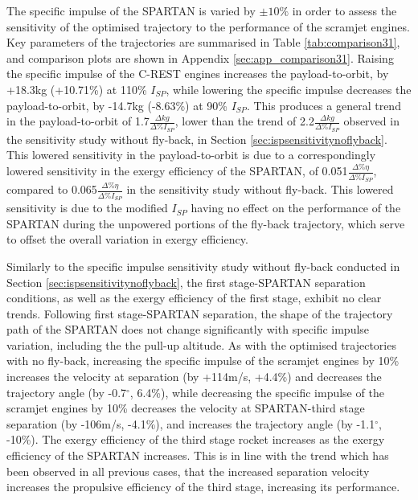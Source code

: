 The specific impulse of the SPARTAN is varied by $\pm10\%$ in order to assess the sensitivity of the optimised trajectory to the performance of the scramjet engines. 
Key parameters of the trajectories are summarised in Table \ref{tab:comparison31}, and comparison plots are shown in Appendix \ref{sec:app_comparison31}.
Raising the specific impulse of the C-REST engines increases the payload-to-orbit, by +18.3kg (+10.71\%) at 110\% $I_{SP}$, while lowering the specific impulse decreases the payload-to-orbit, by -14.7kg (-8.63\%) at 90\% $I_{SP}$. 
This produces a general trend in the payload-to-orbit of 1.7$\frac{\Delta kg}{\Delta \%I_{SP} }$, lower than the trend of 2.2$\frac{\Delta kg}{\Delta \%I_{SP} }$ observed in the sensitivity study without fly-back, in Section \ref{sec:ispsensitivitynoflyback}.
This lowered sensitivity in the payload-to-orbit is due to a correspondingly lowered sensitivity in the exergy efficiency of the SPARTAN, of 0.051$\frac{\Delta \% \eta}{\Delta \%I_{SP} }$, compared to 0.065$\frac{\Delta \% \eta}{\Delta \%I_{SP} }$ in the sensitivity study without fly-back. This lowered sensitivity is due to the modified $I_{SP}$ having no effect on the performance of the SPARTAN during the unpowered portions of the fly-back trajectory, which serve to offset the overall variation in exergy efficiency. 


Similarly to the specific impulse sensitivity study without fly-back conducted in Section \ref{sec:ispsensitivitynoflyback}, the first stage-SPARTAN separation conditions, as well as the exergy efficiency of the first stage, exhibit no clear trends. Following first stage-SPARTAN separation, the shape of the trajectory path of the SPARTAN does not change significantly with specific impulse variation, including the the pull-up altitude. As with the optimised trajectories with no fly-back, increasing the specific impulse of the scramjet engines by 10\% increases the velocity at separation (by +114m/s, +4.4\%) and decreases the trajectory angle (by -0.7$^\circ$, 6.4\%), while decreasing the specific impulse of the scramjet engines by 10\% decreases the velocity at SPARTAN-third stage separation (by -106m/s, -4.1\%), and increases the trajectory angle (by -1.1$^\circ$, -10\%).
The exergy efficiency of the third stage rocket increases as the exergy efficiency of the SPARTAN increases. This is in line with the trend which has been observed in all previous cases, that the increased separation velocity increases the propulsive efficiency of the third stage, increasing its performance. 






